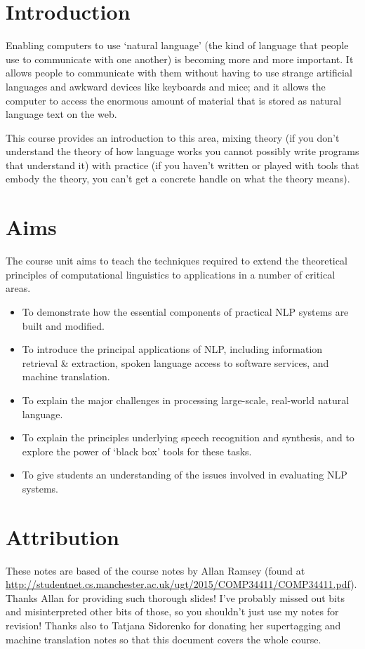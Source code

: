 \section*{Introduction}

Enabling computers to use `natural language' (the kind of language that people
use to communicate with one another) is becoming more and more important. It
allows people to communicate with them without having to use strange artificial
languages and awkward devices like keyboards and mice; and it allows the
computer to access the enormous amount of material that is stored as natural
language text on the web.

This course provides an introduction to this area, mixing theory (if you don't
understand the theory of how language works you cannot possibly write programs
that understand it) with practice (if you haven't written or played with tools
that embody the theory, you can't get a concrete handle on what the theory
means).

\section*{Aims}

The course unit aims to teach the techniques required to extend the theoretical
principles of computational linguistics to applications in a number of critical
areas.

\begin{itemize}
  \item To demonstrate how the essential components of practical NLP systems
  are built and modified.
  \item To introduce the principal applications of NLP, including information
  retrieval \& extraction, spoken language access to software services, and
  machine translation.
  \item To explain the major challenges in processing large-scale, real-world
  natural language.
  \item To explain the principles underlying speech recognition and synthesis,
  and to explore the power of `black box' tools for these tasks.
  \item To give students an understanding of the issues involved in evaluating
  NLP systems.
\end{itemize}

\section*{Attribution}

These notes are based of the course notes by Allan Ramsey (found at
\url{http://studentnet.cs.manchester.ac.uk/ugt/2015/COMP34411/COMP34411.pdf}).
Thanks Allan for providing such thorough slides! I've probably missed out bits
and misinterpreted other bits of those, so you shouldn't just use my notes for
revision! Thanks also to Tatjana Sidorenko for donating her supertagging and
machine translation notes so that this document covers the whole course.
